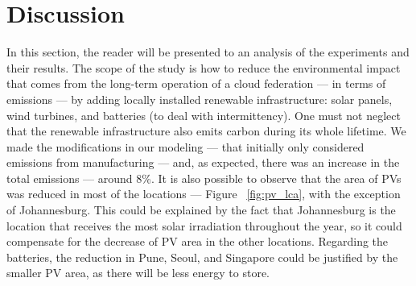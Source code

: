 









\section{Discussion}
\label{sec:long_term_discussion}

In this section, the reader will be presented to an analysis of the experiments and their results. The scope of the study is how to reduce the environmental impact that comes from the long-term operation of a cloud federation --- in terms of  emissions --- by adding locally installed renewable infrastructure: solar panels, wind turbines, and batteries (to deal with intermittency). One must not neglect that the renewable infrastructure also emits carbon during its whole lifetime. We made the modifications in our modeling --- that initially only considered emissions from manufacturing --- and, as expected, there was an increase in the total emissions --- around 8\%. It is also possible to observe that the area of PVs was reduced in most of the locations --- Figure ~\ref{fig:pv_lca}, with the exception of Johannesburg. This could be explained by the fact that Johannesburg is the location that receives the most solar irradiation throughout the year, so it could compensate for the decrease of PV area in the other locations. Regarding the batteries, the reduction in Pune, Seoul, and Singapore could be justified by the smaller PV area, as there will be less energy to store.

